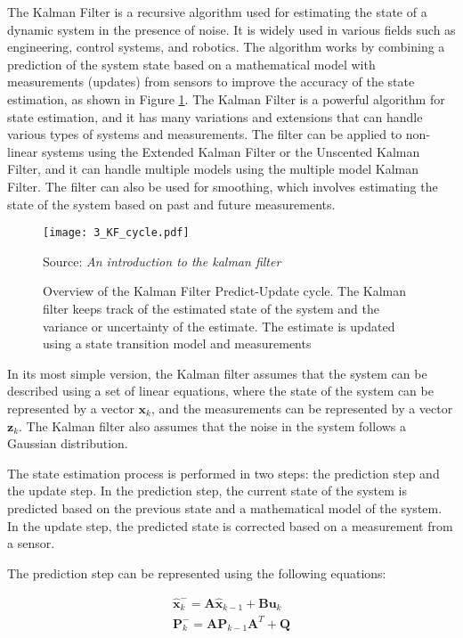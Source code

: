 The Kalman Filter \cite{kalman1960new} is a recursive algorithm used for estimating the state of a dynamic system in the presence of noise. It is widely used in various fields such as engineering, control systems, and robotics. The algorithm works by combining a prediction of the system state based on a mathematical model with measurements (updates) from sensors to improve the accuracy of the state estimation, as shown in Figure \ref{fig:3_KF_cycle}. The Kalman Filter is a powerful algorithm for state estimation, and it has many variations and extensions that can handle various types of systems and measurements. The filter can be applied to non-linear systems using the Extended Kalman Filter or the Unscented Kalman Filter, and it can handle multiple models using the multiple model Kalman Filter. The filter can also be used for smoothing, which involves estimating the state of the system based on past and future measurements.

\begin{figure}[h]
	\centering
	\texttt{[image: 3\_KF\_cycle.pdf]}
	\caption[Overview of the Kalman Filter Predict-Update cycle]{Overview of the Kalman Filter Predict-Update cycle. The Kalman filter keeps track of the estimated state of the system and the variance or uncertainty of the estimate. The estimate is updated using a state transition model and measurements}
	Source: \textit{An introduction to the kalman filter} \cite{bishop2001introduction}
	\label{fig:3_KF_cycle}
\end{figure}

In its most simple version, the Kalman filter assumes that the system can be described using a set of linear equations, where the state of the system can be represented by a vector $\mathbf{x}_k$, and the measurements can be represented by a vector $\mathbf{z}_k$. The Kalman filter also assumes that the noise in the system follows a Gaussian distribution.

The state estimation process is performed in two steps: the prediction step and the update step. In the prediction step, the current state of the system is predicted based on the previous state and a mathematical model of the system. In the update step, the predicted state is corrected based on a measurement from a sensor.

The prediction step can be represented using the following equations:

\begin{equation}
\begin{split}
	\hat{\mathbf{x}}_k^- = \mathbf{A} \hat{\mathbf{x}}_{k-1} + \mathbf{B} \mathbf{u}_k \\
	\mathbf{P}_k^- = \mathbf{A} \mathbf{P}_{k-1} \mathbf{A}^T + \mathbf{Q}
\end{split}
\end{equation}


